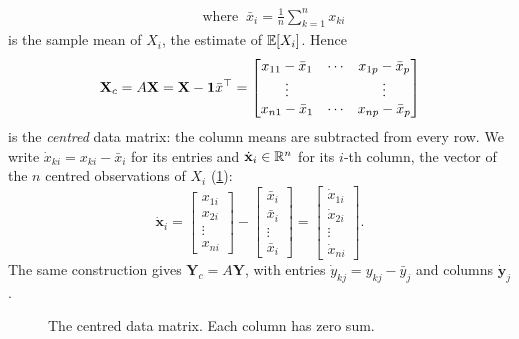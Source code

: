 \begin{notechapter}
\begin{align*}
  \qquad\text{where }\ \bar x_i = \frac1n\sum_{k=1}^nx_{ki}
\end{align*}
is the sample mean of $X_i$, the estimate of $\mathbb{E}[X_i]$. Hence
\[
  \mathbf X_c = A\mathbf X = \mathbf X - \mathbf{1}\bar x^\top =
  \begin{bmatrix}
    x_{11} - \bar x_1 & \cdots & x_{1p} - \bar x_p\\
    \vdots & & \vdots\\
    x_{n1} - \bar x_1 & \cdots & x_{np} - \bar x_p
  \end{bmatrix}
\]
is the \emph{centred} data matrix: the column means are subtracted from every
row. We write $\dot x_{ki} = x_{ki} - \bar x_i$ for its entries and
$\dot{\mathbf x}_i\in\mathbb{R}^n$ for its $i$-th column, the vector of the $n$ centred
observations of $X_i$ (\cref{covariance-estimation:fig:centred}):
\[
  \dot{\mathbf x}_i = \begin{bmatrix}x_{1i}\\ x_{2i}\\ \vdots\\ x_{ni}\end{bmatrix}
  - \begin{bmatrix}\bar x_i\\ \bar x_i\\ \vdots\\ \bar x_i\end{bmatrix}
  = \begin{bmatrix}\dot x_{1i}\\ \dot x_{2i}\\ \vdots\\ \dot x_{ni}\end{bmatrix}.
\]
The same construction gives $\mathbf Y_c = A\mathbf Y$, with entries
$\dot y_{kj} = y_{kj} - \bar y_j$ and columns $\dot{\mathbf y}_j$.

\begin{figure}[ht]
\centering
{}
\caption{The centred data matrix. Each column has zero sum.}
\label{covariance-estimation:fig:centred}
\end{figure}


\end{notechapter}
